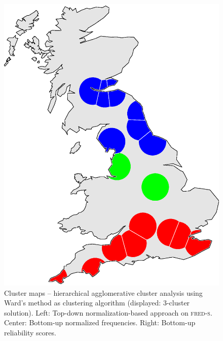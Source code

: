 \documentclass[output=paper]{LSP/langsci}
\begin{document}
\begin{figure}
\begin{minipage}[b]{0.30\linewidth}
    \includegraphics [keepaspectratio,width=.98\textwidth] {illustrations/wolk_noisy_cluster_reli7-3groups.eps}
\end{minipage}
\caption{Cluster maps -- hierarchical agglomerative cluster analysis using Ward's method as clustering algorithm (displayed: 3-cluster solution). Left: Top-down normalization-based approach on \textsc{fred-s}. Center: Bottom-up normalized frequencies. Right: Bottom-up reliability scores.} \label{fig:wolk:bup-maps}

\end{figure}
\end{document}
